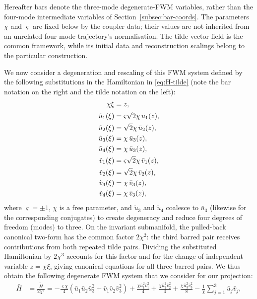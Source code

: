 \documentclass[11pt,a4paper]{article}
\numberwithin{equation}{section}
\begin{document}
Hereafter bars denote the three-mode degenerate-FWM variables, rather than the four-mode intermediate variables of Section~\ref{subsec:bar-coords}.
The parameters $\chi$ and $\varsigma$ are fixed below by the coupler data; their values are not inherited from an unrelated four-mode trajectory's normalisation.
The tilde vector field is the common framework, while its initial data and reconstruction scalings belong to the particular construction.

We now consider a degeneration and rescaling of this FWM system defined by the following substitutions in the Hamiltonian in \eqref{eq:H-tilde} (note the bar notation on the right and the tilde notation on the left):
\begin{align}
  \chi\xi &= z, \notag \\
  \tilde{u}_1(\xi) &= \varsigma \sqrt{2}\chi \,\bar{u}_1(z), \notag \\
  \tilde{u}_2(\xi) &= \sqrt{2} \chi  \,\bar{u}_2(z), \notag \\
  \tilde{u}_3(\xi) &= \chi  \,\bar{u}_3(z), \notag \\
  \tilde{u}_4(\xi) &= \chi  \,\bar{u}_3(z), \notag \\
  \tilde{v}_1(\xi) &= \varsigma \sqrt{2} \chi  \,\bar{v}_1(z), \notag \\
  \tilde{v}_2(\xi) &= \sqrt{2} \chi  \,\bar{v}_2(z), \notag \\
  \tilde{v}_3(\xi) &= \chi  \,\bar{v}_3(z), \notag \\
  \tilde{v}_4(\xi) &= \chi  \,\bar{v}_3(z), \notag \\
\end{align}
where $\varsigma = \pm 1$, $\chi$ is a free parameter, and $\tilde{u}_3$ and $\tilde{u}_4$ coalesce to $\bar{u}_3$ (likewise for the corresponding conjugates) to create degeneracy and reduce four degrees of freedom (modes) to three.
On the invariant submanifold, the pulled-back canonical two-form has the common factor $2\chi^2$: the third barred pair receives contributions from both repeated tilde pairs.
Dividing the substituted Hamiltonian by $2\chi^3$ accounts for this factor and for the change of independent variable $z=\chi\xi$, giving canonical equations for all three barred pairs.
We thus obtain the following degenerate FWM system that we consider for our projection:
\begin{align}
\bar{H} &= \frac{\tilde{H}}{2 \chi^{3}} = - \frac{\varsigma \chi }{4}\left( \bar{u}_1 \bar{u}_2 \bar{u}^{2}_3 + \bar{v}_1 \bar{v}_2 \bar{v}^{2}_3 \right) + \frac{\chi \bar{u}^{2}_1 \bar{v}^{2}_1}{4} + \frac{\chi \bar{u}^{2}_2 \bar{v}^{2}_2}{4} + \frac{\chi \bar{u}^{2}_3 \bar{v}^{2}_3}{8} - \frac{1}{\chi}\sum_{j=1}^{3}\bar{u}_j \bar{v}_j, \label{cc:eq:Hbar-deg-fem}
\end{align}
\end{document}
